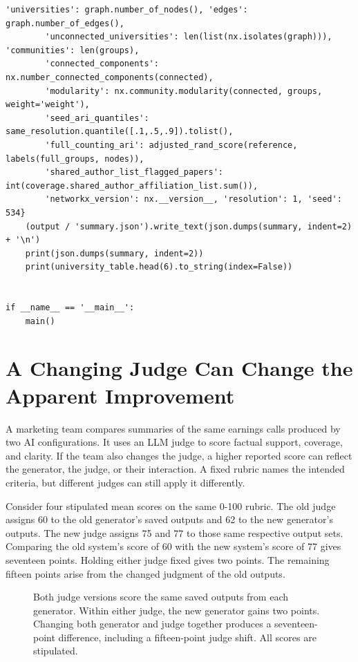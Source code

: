 \begin{Verbatim}[breaklines,breakanywhere,fontsize=\small]
        'universities': graph.number_of_nodes(), 'edges': graph.number_of_edges(),
        'unconnected_universities': len(list(nx.isolates(graph))), 'communities': len(groups),
        'connected_components': nx.number_connected_components(connected),
        'modularity': nx.community.modularity(connected, groups, weight='weight'),
        'seed_ari_quantiles': same_resolution.quantile([.1,.5,.9]).tolist(),
        'full_counting_ari': adjusted_rand_score(reference, labels(full_groups, nodes)),
        'shared_author_list_flagged_papers': int(coverage.shared_author_affiliation_list.sum()),
        'networkx_version': nx.__version__, 'resolution': 1, 'seed': 534}
    (output / 'summary.json').write_text(json.dumps(summary, indent=2) + '\n')
    print(json.dumps(summary, indent=2))
    print(university_table.head(6).to_string(index=False))


if __name__ == '__main__':
    main()
\end{Verbatim}

\hypertarget{M05-a-changing-judge-can-change-the-apparent-improvement}{%
\section{A Changing Judge Can Change the Apparent
Improvement}\label{M05-a-changing-judge-can-change-the-apparent-improvement}}

\noindent \noindent A marketing team compares summaries of the same earnings calls
produced by two AI configurations. It uses an LLM judge to score factual
support, coverage, and clarity. If the team also changes the judge, a
higher reported score can reflect the generator, the judge, or their
interaction. A fixed rubric names the intended criteria, but different
judges can still apply it differently.

Consider four stipulated mean scores on the same 0-100 rubric. The old
judge assigns 60 to the old generator's saved outputs and 62 to the new
generator's outputs. The new judge assigns 75 and 77 to those same
respective output sets. Comparing the old system's score of 60 with the
new system's score of 77 gives seventeen points. Holding either judge
fixed gives two points. The remaining fifteen points arise from the
changed judgment of the old outputs.

\begin{figure}[htbp]
\centering

\caption{Both judge versions score the same saved outputs from each generator. Within either judge, the new generator gains two points. Changing both generator and judge together produces a seventeen-point difference, including a fifteen-point judge shift. All scores are stipulated.}\label{fig:M05_judge_change}
\end{figure}

